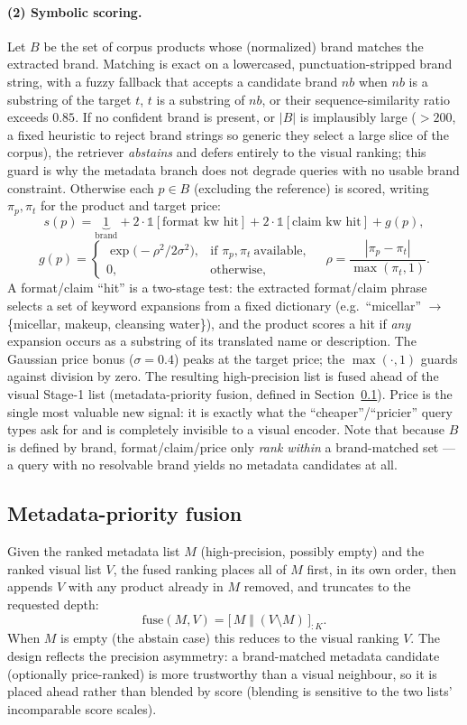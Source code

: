 \documentclass[sigconf,nonacm]{acmart}
\begin{document}
\paragraph{(2) Symbolic scoring.}
Let $B$ be the set of corpus products whose (normalized) brand matches the
extracted brand. Matching is exact on a lowercased, punctuation-stripped
brand string, with a fuzzy fallback that accepts a candidate brand $nb$ when
$nb$ is a substring of the target $t$, $t$ is a substring of $nb$, or their
sequence-similarity ratio exceeds $0.85$. If no confident brand is present,
or $|B|$ is implausibly large ($>200$, a fixed heuristic to reject
brand strings so generic they select a large slice of the corpus), the
retriever \emph{abstains} and defers entirely to the visual ranking; this
guard is why the metadata branch does not degrade queries with no usable
brand constraint. Otherwise each $p\in B$ (excluding the reference) is scored,
writing $\pi_p,\pi_t$ for the product and target price:
\[
s(p)=\underbrace{1}_{\text{brand}}
      +2\cdot\mathbb{1}[\text{format kw hit}]
      +2\cdot\mathbb{1}[\text{claim kw hit}]+g(p),
\]
\[
g(p)=\begin{cases}
\exp\!\big(-\rho^2/2\sigma^2\big), & \text{if } \pi_p,\pi_t\ \text{available},\\[2pt]
0, & \text{otherwise},
\end{cases}
\quad
\rho=\frac{|\pi_p-\pi_t|}{\max(\pi_t,1)}.
\]
A format/claim ``hit'' is a two-stage test: the extracted format/claim phrase
selects a set of keyword expansions from a fixed dictionary (e.g.\ ``micellar''
$\to$ \{micellar, makeup, cleansing water\}), and the product scores a hit if
\emph{any} expansion occurs as a substring of its translated name or
description. The Gaussian price bonus ($\sigma{=}0.4$) peaks at the target
price; the $\max(\cdot,1)$ guards against division by zero. The resulting
high-precision list is fused ahead of the visual Stage-1 list
(metadata-priority fusion, defined in Section~\ref{sec:fusion}). Price is the
single most valuable new signal: it is exactly what the ``cheaper''/``pricier''
query types ask for and is completely invisible to a visual encoder. Note
that because $B$ is defined by brand, format/claim/price only \emph{rank
within} a brand-matched set --- a query with no resolvable brand yields no
metadata candidates at all.

\subsection{Metadata-priority fusion}
\label{sec:fusion}
Given the ranked metadata list $M$ (high-precision, possibly empty) and the
ranked visual list $V$, the fused ranking places all of $M$ first, in its own
order, then appends $V$ with any product already in $M$ removed, and
truncates to the requested depth:
\[
\text{fuse}(M,V) = \big[\,M \;\Vert\; (V \setminus M)\,\big]_{:K}.
\]
When $M$ is empty (the abstain case) this reduces to the visual ranking $V$.
The design reflects the precision asymmetry: a brand-matched metadata
candidate (optionally price-ranked) is more trustworthy than a visual
neighbour, so it is placed ahead rather than blended by score (blending is
sensitive to the two lists' incomparable score scales).
\end{document}
